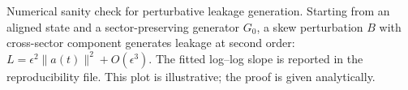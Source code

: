 \caption{Numerical sanity check for perturbative leakage generation. Starting from an aligned state and a sector-preserving generator \(G_0\), a skew perturbation \(B\) with cross-sector component generates leakage at second order: \(L=\epsilon^2\|a(t)\|^2+O(\epsilon^3)\). The fitted log--log slope is reported in the reproducibility file. This plot is illustrative; the proof is given analytically.}
